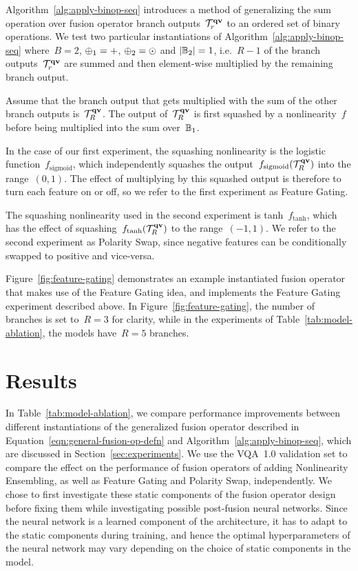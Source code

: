 Algorithm~\ref{alg:apply-binop-seq} introduces a method of generalizing the sum
operation over fusion operator branch outputs~$\mathcal{T}_r^{\mathbf{q}{}\mathbf{v}{}}$ to an ordered set
of binary operations. We test two particular instantiations of
Algorithm~\ref{alg:apply-binop-seq} where~$B = 2$, $\operatorname*{\oplus}_1 = +$,
$\operatorname*{\oplus}_2 = \odot$ and $|\mathbb{B}_2| = 1$, i.e.~$R - 1$ of the branch
outputs~$\mathcal{T}_r^{\mathbf{q}{}\mathbf{v}{}}$ are summed and then element-wise multiplied by the
remaining branch output.

Assume that the branch output that gets multiplied with the sum of the other
branch outputs is~$\mathcal{T}_R^{\mathbf{q}{}\mathbf{v}{}}$. The output of~$\mathcal{T}_R^{\mathbf{q}{}\mathbf{v}{}}$ is first
squashed by a nonlinearity~$f$ before being multiplied into the sum
over~$\mathbb{B}_1$.

In the case of our first experiment, the squashing nonlinearity is the logistic
function~$f_\mathrm{sigmoid}$, which independently squashes the
output~$f_\mathrm{sigmoid}(\mathcal{T}_R^{\mathbf{q}{}\mathbf{v}{}})$ into the range~$(0, 1)$. The
effect of multiplying by this squashed output is therefore to turn each feature
on or off, so we refer to the first experiment as Feature Gating.

The squashing nonlinearity used in the second experiment is
tanh~$f_{\tanh}$, which has the effect of
squashing~$f_{\tanh}(\mathcal{T}_R^{\mathbf{q}{}\mathbf{v}{}})$ to the range~$(-1, 1)$. We refer to the
second experiment as Polarity Swap, since negative features can be
conditionally swapped to positive and vice-versa.

Figure~\ref{fig:feature-gating} demonstrates an example instantiated fusion
operator that makes use of the Feature Gating idea, and implements the
Feature Gating experiment described above. In Figure~\ref{fig:feature-gating},
the number of branches is set to~$R = 3$ for clarity, while in the experiments
of Table~\ref{tab:model-ablation}, the models have~$R = 5$ branches.


\section{Results}

In Table~\ref{tab:model-ablation}, we compare performance improvements between
different instantiations of the generalized fusion operator described in
Equation~\ref{eqn:general-fusion-op-defn} and
Algorithm~\ref{alg:apply-binop-seq}, which are discussed in
Section~\ref{sec:experiments}. We use the VQA~1.0 validation set to compare the
effect on the performance of fusion operators of adding Nonlinearity
Ensembling, as well as Feature Gating and Polarity Swap, independently. We
chose to first investigate these static components of the fusion operator
design before fixing them while investigating possible post-fusion neural
networks.  Since the neural network is a learned component of the architecture,
it has to adapt to the static components during training, and hence the optimal
hyperparameters of the neural network may vary depending on the choice of
static components in the model.

